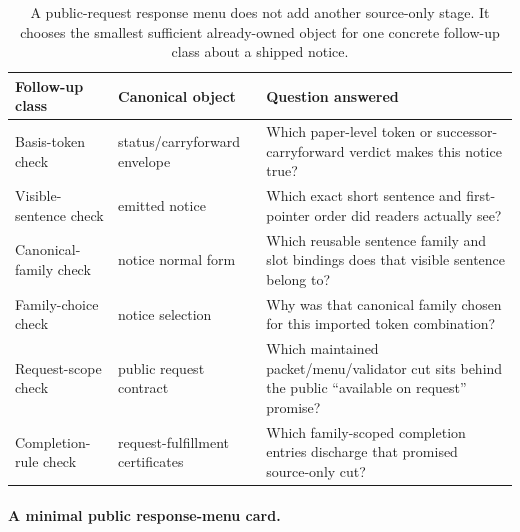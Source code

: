\documentclass[11pt]{article}
\begin{document}
\begin{table}[t]
\centering
\small
\begin{tabularx}{\linewidth}{@{}l l X@{}}
\toprule
Follow-up class & Canonical object & Question answered \\
\midrule
Basis-token check & status/carryforward envelope & Which paper-level token or successor-carryforward verdict makes this notice true? \\
Visible-sentence check & emitted notice & Which exact short sentence and first-pointer order did readers actually see? \\
Canonical-family check & notice normal form & Which reusable sentence family and slot bindings does that visible sentence belong to? \\
Family-choice check & notice selection & Why was that canonical family chosen for this imported token combination? \\
Request-scope check & public request contract & Which maintained packet/menu/validator cut sits behind the public ``available on request'' promise? \\
Completion-rule check & request-fulfillment certificates & Which family-scoped completion entries discharge that promised source-only cut? \\
\bottomrule
\end{tabularx}
\caption{A public-request response menu does not add another source-only stage. It chooses the smallest sufficient already-owned object for one concrete follow-up class about a shipped notice.}
\label{tab:publicrequestresponsemenu}
\end{table}

\paragraph{A minimal public response-menu card.}
\end{document}
